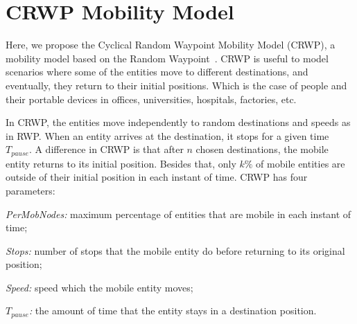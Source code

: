 \section{CRWP Mobility Model}
\label{sec:mobility-model}

Here, we propose the Cyclical Random Waypoint Mobility Model (CRWP), a mobility model based on the Random Waypoint~\cite{bai2004survey}. CRWP is useful to model scenarios where some of the entities move to different destinations, and eventually, they return to their initial positions. Which is the case of people and their portable devices in offices, universities, hospitals, factories, etc.

In CRWP, the entities move independently to random destinations and speeds as in RWP. When an entity arrives at the destination, it stops for a given time $T_{pause}$. A difference in CRWP is that after $n$ chosen destinations, the mobile entity returns to its initial position. Besides that, only $k\%$ of mobile entities are outside of their initial position in each instant of time.
CRWP has four parameters: 
\begin{inparaenum}[i)]
    \item \textit{PerMobNodes:} maximum percentage of entities that are mobile in each instant of time;
    \item \textit{Stops:} number of stops that the mobile entity do before returning to its original position; 
    \item \textit{Speed:} speed which the mobile entity moves;
    \item \textit{$T_{pause}$:} the amount of time that the entity stays in a destination position.
\end{inparaenum}